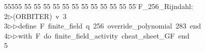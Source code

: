 %
%
\begin{tabbing}
55555 \= 55 \= 55 \= 55 \= 55 \= 55 \= 55 \= 55 \= 55 \= 55 \= 55 \= 55 \= 55 \= \>F\_256\_Rijndahl:\\[0pt]
2\>$\triangleright$\>(ORBITER)\ v\ 3\ \\[0pt]
3\>$\triangleright$\>$\triangleright$\>define\ F\ finite\_field\ q\ 256\ override\_polynomial\ 283\ end\ \\[0pt]
4\>$\triangleright$\>$\triangleright$\>with\ F\ do\ finite\_field\_activity\ cheat\_sheet\_GF\ end\\[0pt]
5\>\end{tabbing}
